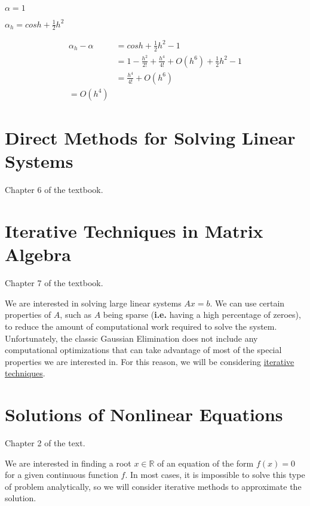 \documentclass[12pt]{book}
\newcommand{\ie}{\textbf{i.e.}\xspace}
\begin{document}
$\alpha = 1$

$\alpha_h = cos h + \frac{1}{2} h^2$

\begin{align*}
  \alpha_h - \alpha &= cos h + \frac{1}{2} h^2 - 1\\
  &= 1-\frac{h^2}{2!}+\frac{h^4}{4!} + O(h^6) + \frac{1}{2}h^2 - 1 \\
  &= \frac{h^4}{4!} + O(h^6) \\
  = O(h^4)
\end{align*}

\chapter{Direct Methods for Solving Linear Systems}
Chapter 6 of the textbook.







\chapter{Iterative Techniques in Matrix Algebra}
Chapter 7 of the textbook.

We are interested in solving large linear systems $Ax = b$. We can use certain
properties of $A$, such as $A$ being sparse (\ie having a high percentage of
zeroes), to reduce the amount of computational work required to solve the
system. Unfortunately, the classic Gaussian Elimination does not include any
computational optimizations that can take advantage of most of the special
properties we are interested in. For this reason, we will be considering
\uline{iterative techniques}.







\chapter{Solutions of Nonlinear Equations} 
Chapter 2 of the text.

We are interested in finding a root $x \in \mathbb{R}$ of an equation of the
form $f(x) = 0$ for a given continuous function $f$. In most cases, it is
impossible to solve this type of problem analytically, so we will consider
iterative methods to approximate the solution.
\end{document}
